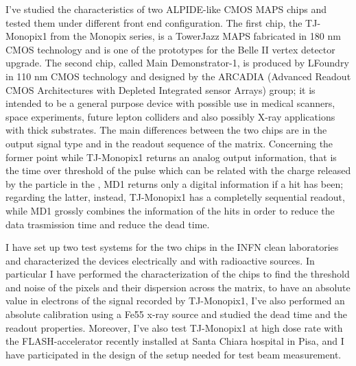 I've studied the characteristics of two ALPIDE-like CMOS MAPS chips and tested them under different front end configuration. The first chip, the TJ-Monopix1 from the Monopix series, is a TowerJazz MAPS fabricated in 180 nm CMOS technology and is one of the prototypes for the Belle II vertex detector upgrade. The second chip, called Main Demonstrator-1, is produced by LFoundry in 110 nm CMOS technology and designed by the ARCADIA (Advanced Readout CMOS Architectures with Depleted Integrated sensor Arrays) group; it is intended to be a general purpose device with possible use in medical scanners, space experiments, future lepton colliders and also possibly X-ray applications with thick substrates.  
The main differences between the two chips are in the output signal type and in the readout sequence of the matrix. Concerning the former point while TJ-Monopix1 returns an analog output information, that is the time over threshold of the pulse which can be related with the charge released by the particle in the , MD1 returns only a digital information if a hit has been; regarding the latter, instead, TJ-Monopix1 has a completelly sequential readout, while MD1 grossly combines the information of the hits in order to reduce the data trasmission time and reduce the dead time.

I have set up two test systems for the two chips in the INFN clean laboratories and characterized the devices electrically and with radioactive sources. 
In particular I have performed the characterization of the chips to find the threshold and noise of the pixels and their dispersion across the matrix, to have an absolute value in electrons of the signal recorded by TJ-Monopix1, I've also performed an absolute calibration using a Fe55 x-ray source and studied the dead time and the readout properties. 
Moreover, I've also test TJ-Monopix1 at high dose rate with the FLASH-accelerator recently installed at Santa Chiara hospital in Pisa, and I have participated in the design of the setup needed for test beam measurement.



